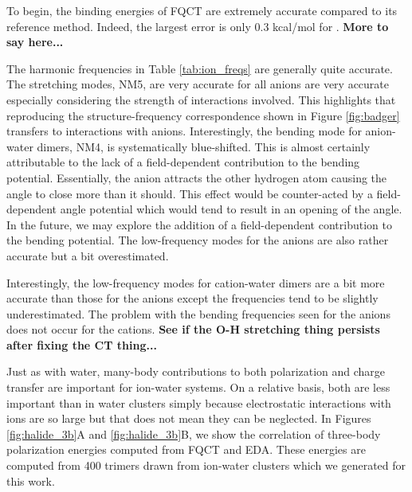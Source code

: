 \documentclass[journal=jacsat,manuscript=article]{achemso}
\begin{document}
To begin, the binding energies of FQCT are extremely accurate compared to its reference method. Indeed, the largest error is only 0.3 kcal/mol for . \textbf{More  to say here...}

The harmonic frequencies in Table \ref{tab:ion_freqs} are generally quite accurate. The  stretching modes, NM5, are very accurate for all anions are very accurate especially considering the strength of interactions involved. This highlights that reproducing the structure-frequency correspondence shown in Figure \ref{fig:badger} transfers to interactions with anions. Interestingly, the bending mode for anion-water dimers, NM4, is systematically blue-shifted. This is almost certainly attributable to the lack of a field-dependent contribution to the bending potential. Essentially, the anion attracts the other hydrogen atom causing the  angle to close more than it should. This effect would be counter-acted by a field-dependent angle potential which would tend to result in an opening of the  angle. In the future, we may explore the addition of a field-dependent contribution to the bending potential. The low-frequency modes for the anions are also rather accurate but a bit overestimated.

Interestingly, the low-frequency modes for cation-water dimers are a bit more accurate than those for the anions except the frequencies tend to be slightly underestimated. The problem with the bending frequencies seen for the anions does not occur for the cations. \textbf{See if the O-H stretching thing persists
after fixing the CT thing...}

Just as with water, many-body contributions to both polarization and charge transfer are important for ion-water systems. On a relative basis, both are less important than in water clusters simply because electrostatic interactions with ions are so large but that does not mean they can be neglected. In Figures \ref{fig:halide_3b}A and \ref{fig:halide_3b}B, we show the correlation of three-body polarization energies computed from FQCT and EDA. These energies are computed from 400 trimers drawn from ion-water clusters which we generated for this work.
\end{document}
